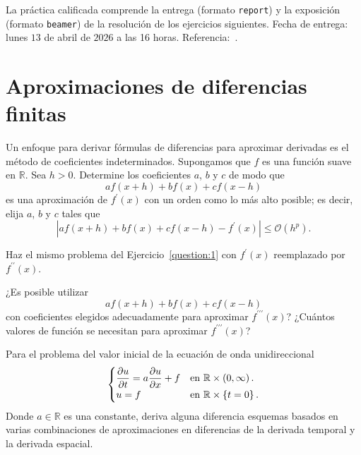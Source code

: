 \noindent
La práctica calificada comprende la entrega (formato \verb|report|)
y la exposición (formato \verb|beamer|) de la resolución de los
ejercicios siguientes.
Fecha de entrega: lunes $13$ de abril de $2026$ a las 16 horas.
Referencia:~\cite{Atkinson2009}.

\section*{Aproximaciones de diferencias finitas}

\begin{questions}
	\question\label{question:1}

	Un enfoque para derivar fórmulas de diferencias para aproximar
	derivadas es el método de coeficientes indeterminados.
	Supongamos que $f$ es una función suave en $\mathbb{R}$.
	Sea $h>0$.
	Determine los coeficientes $a$, $b$ y $c$ de modo que
	\begin{equation*}
		af\left(x+h\right)+
		bf\left(x\right)+
		cf\left(x-h\right)
	\end{equation*}
	es una aproximación de $f^{\prime}\left(x\right)$ con un orden como
	lo más alto posible; es decir, elija $a$, $b$ y $c$ tales que
	\begin{equation*}
		\left|
		af\left(x+h\right)+bf\left(x\right)+
		cf\left(x-h\right)-f^{\prime}\left(x\right)
		\right|\leq
		\mathcal{O}\left(h^{p}\right).
	\end{equation*}

	\question

	Haz el mismo problema del Ejercicio~\ref{question:1} con
	$f^{\prime}\left(x\right)$ reemplazado por
	$f^{\prime\prime}\left(x\right)$.

	\question

	¿Es posible utilizar
	\begin{equation*}
		af\left(x+h\right)+
		bf\left(x\right)+
		cf\left(x-h\right)
	\end{equation*}
	con coeficientes elegidos adecuadamente para aproximar
	$f^{\prime\prime\prime}\left(x\right)$?
	¿Cuántos valores de función se necesitan para aproximar
	$f^{\prime\prime\prime}\left(x\right)$?

	\question\label{question:4}

	Para el problema del valor inicial de la ecuación de onda
	unidireccional
	\begin{equation}\label{eq:IVP-one-way-PDE}
		\begin{cases}\displaystyle
			\diffp{u}{t}=
			a\diffp{u}{x}+
			f   &
			\text{en }\mathbb{R}\times\left(0,\infty\right). \\
			u=f &
			\text{en }\mathbb{R}\times\left\{t=0\right\}.
		\end{cases}
	\end{equation}
	Donde $a\in\mathbb{R}$ es una constante, deriva alguna diferencia
	esquemas basados en varias combinaciones de aproximaciones en
	diferencias de la derivada temporal y la derivada espacial.


\end{questions}
